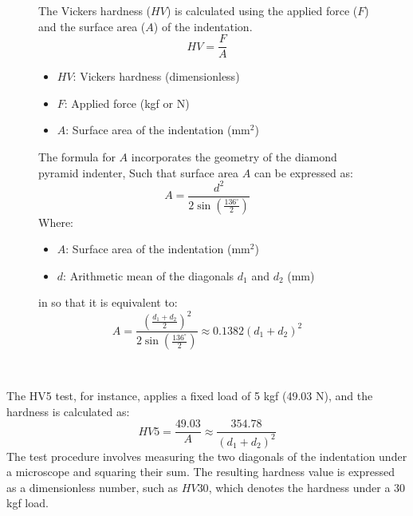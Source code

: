 \documentclass{article}
\begin{document}
\begin{figure}[H]
\begin{minipage}{0.51\textwidth}
            The Vickers hardness (\(HV\)) is calculated using the applied force (\(F\)) and the surface area (\(A\)) of the indentation. 
            \begin{equation}
                    HV = \frac{F}{A}
            \end{equation}
            \begin{itemize}[itemsep=-1mm]
                \item \(HV\): Vickers hardness (dimensionless)
                \item \(F\): Applied force (kgf or N)
                \item \(A\): Surface area of the indentation (mm\(^2\))
                
            \end{itemize}
            The formula for $A$ incorporates the geometry of the diamond pyramid indenter, 
            Such that surface area \(A\) can be expressed as:
            \begin{equation}
                A = \frac{d^2}{2\sin\left(\frac{136^\circ}{2}\right)}
            \end{equation}
            Where:  
            \begin{itemize}[itemsep=-1mm]
                \item \(A\): Surface area of the indentation (mm\(^2\))
                \item \(d\): Arithmetic mean of the diagonals \(d_1\) and \(d_2\) (mm)
            \end{itemize}
            in so that it is equivalent to:
            \begin{equation}
                    A= \frac{\left(\frac{d_1+d_2}{2}\right)^2}{2\sin\left(\frac{136^\circ}{2}\right)} \approx 0.1382\left(d_1 + d_2\right)^2
            \end{equation}
        \end{minipage}\\
    \end{figure}
    \vspace{-0.1em}\noindent
    The HV5 test, for instance, applies a fixed load of 5 kgf (49.03 N), and the hardness is calculated as:  
    \begin{equation}
        HV5 = \frac{49.03}{A} \approx \frac{354.78}{\left(d_1 + d_2\right)^2}
    \end{equation}
The test procedure involves measuring the two diagonals of the indentation under a microscope and squaring their sum. The resulting hardness value is expressed as a dimensionless number, such as \(HV30\), which denotes the hardness under a 30 kgf load.  
\end{document}
